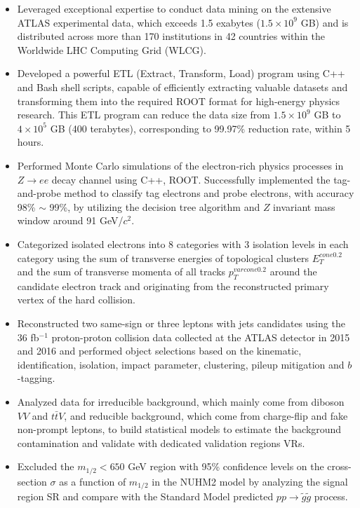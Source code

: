 \documentclass[margin, 10pt]{res} %
\begin{document}
\begin{resume}
\begin{itemize}
    \item Leveraged exceptional expertise to conduct data mining on the extensive ATLAS experimental data, which exceeds 1.5 exabytes ($1.5 \times 10^9$ GB) and is distributed across more than 170 institutions in 42 countries within the Worldwide LHC Computing Grid (WLCG).
    \item Developed a powerful ETL (Extract, Transform, Load) program using C++ and Bash shell scripts, capable of efficiently extracting valuable datasets and transforming them into the required ROOT format for high-energy physics research. This ETL program can reduce the data size from $1.5 \times 10^{9}$ GB to $4 \times 10^5$ GB (400 terabytes), corresponding to 99.97\% reduction rate, within 5 hours. 
    \item Performed Monte Carlo simulations of the electron-rich physics processes in $Z \rightarrow ee$ decay channel using C++, ROOT. Successfully implemented the tag-and-probe method to classify tag electrons and probe electrons, with accuracy 98\% $\sim$ 99\%, by utilizing the decision tree algorithm and $Z$ invariant mass window around 91 GeV/$c^2$.
    \item Categorized isolated electrons into 8 categories with 3 isolation levels in each category using the sum of transverse energies of topological clusters $E_{T}^{cone 0.2}$ and the sum of transverse momenta of all tracks $p_{T}^{varcone 0.2}$ around the candidate electron track and originating from the reconstructed primary vertex of the hard collision.
    \item Reconstructed two same-sign or three leptons with jets candidates using the 36 fb$^{-1}$ proton-proton collision data collected at the ATLAS detector in 2015 and 2016 and performed object selections based on the kinematic, identification, isolation, impact parameter, clustering, pileup mitigation  and $b$-tagging.
    \item Analyzed data for irreducible background, which mainly come from diboson $VV$ and $t\bar{t}V$, and reducible background, which come from charge-flip and fake non-prompt leptons, to build statistical models to estimate the background contamination and validate with dedicated validation regions VRs.
    \item Excluded the $m_{1/2} < 650$ GeV region with 95\% confidence levels on the cross-section $\sigma$ as a function of $m_{1/2}$ in the NUHM2 model by analyzing the signal region SR and compare with the Standard Model predicted $pp \rightarrow \tilde{g}\tilde{g}$ process.

\end{itemize}
\end{resume}
\end{document}
